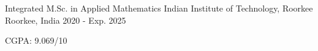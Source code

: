 

\begin{cventries}

  \cventry
    {Integrated M.Sc. in Applied Mathematics} %
    {Indian Institute of Technology, Roorkee} %
    {Roorkee, India} %
    {2020 - Exp. 2025} %
    {
      \begin{cvitems} %
        \item {CGPA: 9.069/10}
      \end{cvitems}
    }

\end{cventries}
